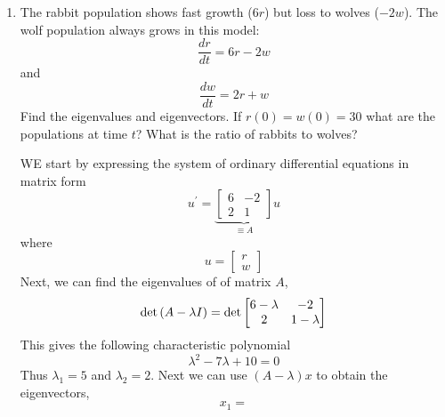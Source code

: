 \begin{enumerate}[label=\arabic*.]
    \item The rabbit population shows fast growth ($6r$) but loss to wolves
        ($-2w$). The wolf population always grows in this model:
    \begin{equation}
        \frac{dr}{dt}=6r-2w
    \end{equation}
    and
    \begin{equation}
        \frac{dw}{dt}=2r+w
    \end{equation}
    Find the eigenvalues and eigenvectors. If $r(0)=w(0)=30$ what are the
    populations at time $t$? What is the ratio of rabbits to wolves?
    \begin{mdframed}[style=MyFrame]
        WE start by expressing the system of ordinary differential
        equations in matrix form 
        \begin{equation}
            u^{\prime} =
            \underbrace{
            \begin{bmatrix}
                6       &       -2  \\
                2       &       1
            \end{bmatrix}
        }_{\equiv A}
            u
        \end{equation}
        where
        \begin{equation}
            u = 
            \begin{bmatrix}
                r   \\
                w
            \end{bmatrix}
        \end{equation}
        Next, we can find the eigenvalues of of matrix $A$,
        \begin{equation}
            \text{det}\left(A-\lambda I\right) =
            \text{det}
            \begin{bmatrix}
                6-\lambda       &       -2              \\
                2               &       1-\lambda
            \end{bmatrix}
        \end{equation}
        This gives the following characteristic polynomial
        \begin{equation}
            \lambda^{2} - 7\lambda + 10 = 0
        \end{equation}
        Thus $\lambda_{1} = 5$ and $\lambda_{2} = 2$. Next we can use
        $(A-\lambda)x$ to obtain the eigenvectors,
        \begin{equation}
            x_{1} = 

\end{equation}
\end{mdframed}
\end{enumerate}
